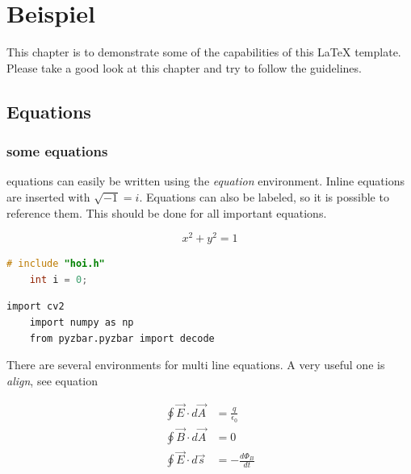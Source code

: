 
\chapter{Beispiel}

This chapter is to demonstrate some of the capabilities of this \LaTeX{} template.
Please take a good look at this chapter and try to follow the guidelines.

\section{Equations}
\subsection{some equations}
%
\glspl{equation} can easily be written using the \emph{\gls{equation}}
environment. Inline equations are inserted with $\sqrt{-1} = i $. Equations can
also be labeled, so it is possible to reference them. This should be done for
all important equations.

\begin{equation}
    x^2 + y^2 = 1
    \label{equ:bsp_chapter:example_equation}
\end{equation}

\begin{lstlisting}[language=C,label=bsp,caption=bsp]
	# include "hoi.h"
	int i = 0;
\end{lstlisting}

\begin{lstlisting}[label=bsp,caption=bsp]
	import cv2
	import numpy as np
	from pyzbar.pyzbar import decode
\end{lstlisting}

%

There are several environments for multi line equations. A very useful one
is \emph{align}, see equation %

\begin{align}
    \oint \vec{E} \cdot d \vec{A} & = \frac{q}{\epsilon_0}  \\
    \oint \vec{B} \cdot d \vec{A} & = 0                     \\
    \oint \vec{E} \cdot d \vec{s} & = - \frac{d \Phi_B}{dt}
    \label{equ:bsp_chapter:example_align}
\end{align}

